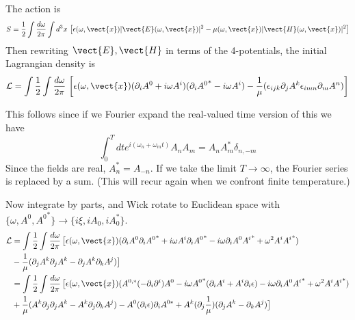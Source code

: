 The action is 
\begin{equation}
  S = \frac{1}{2}\int\frac{d\omega}{2\pi}\int d^3x\,\left[ 
    \epsilon(\omega,\vect{x})|\vect{E}(\omega,\vect{x})|^2 - \mu(\omega,\vect{x})|\vect{H}(\omega,\vect{x})|^2\right]
\end{equation}
Then rewriting $\vect{E},\vect{H}$ in terms of the 4-potentials, the initial Lagrangian density is 
\begin{equation}
 \mathcal{L}= \int\frac{1}{2}\int\frac{d\omega}{2\pi}\,\left[ 
    \epsilon(\omega,\vect{x})(\partial_i A^0+i\omega A^i)(\partial_i {A^0}^*-i\omega A^i)
- \frac{1}{\mu}(\epsilon_{ijk}\partial_jA^k\epsilon_{imn}\partial_mA^n)\right]
\end{equation}
\begin{shaded}
This follows since if we Fourier expand the real-valued time version of this we have 
\begin{equation}
  \int_{0}^T dt e^{i(\omega_n+\omega_mt)}A_nA_m = A_nA_m^*\delta_{n,-m}
\end{equation}
Since the fields are real, $A_n^* = A_{-n}$.  If we take the limit $T\rightarrow\infty$,
the Fourier series is replaced by a sum.  (This will recur again when we confront finite temperature.)
\end{shaded}
Now integrate by parts, and Wick rotate to Euclidean space with 
$\{\omega, A^0, {A^0}^*\}\rightarrow \{i\xi,iA_0,iA_0^*\}$.
\begin{align}
 \mathcal{L}&= \int\frac{1}{2}\int\frac{d\omega}{2\pi}\,\big[ 
    \epsilon(\omega,\vect{x})(\partial_i A^0\partial_i {A^0}^*+i\omega A^i\partial_i {A^0}^*
    -i\omega\partial_iA^0{A^i}^* +\omega^2A^i {A^i}^*)\nonumber\\
    &- \frac{1}{\mu}(\partial_jA^k\partial_jA^k-\partial_jA^k\partial_kA^j)\big]\\
&= \int\frac{1}{2}\int\frac{d\omega}{2\pi}\,\big[ 
    \epsilon(\omega,\vect{x})( A^{0,*}(-\partial_i\partial^i) A^0-i\omega {A^0}^*(\partial_iA^i+A^i\partial_i\epsilon)
    -i\omega\partial_iA^0{A^i}^*+\omega^2A^i {A^i}^*)\nonumber\\
    &+ \frac{1}{\mu}(A^k\partial_j\partial_jA^k-A^k\partial_j\partial_kA^j) 
    -A^0(\partial_i\epsilon)\partial_iA^{0*} +A^k(\partial_j\frac{1}{\mu})(\partial_jA^k-\partial_kA^j)\big]
\end{align}
